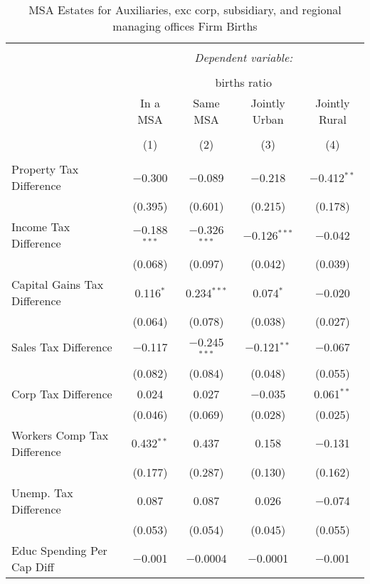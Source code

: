 
\begin{table}[!htbp] \centering 
  \caption{MSA Estates for  Auxiliaries, exc corp, subsidiary, and regional managing offices Firm Births} 
  \label{95metro} 
\begin{tabular}{@{\extracolsep{5pt}}lcccc} 
\\[-1.8ex]\hline 
\hline \\[-1.8ex] 
 & \multicolumn{4}{c}{\textit{Dependent variable:}} \\ 
\cline{2-5} 
\\[-1.8ex] & \multicolumn{4}{c}{births ratio} \\ 
 & In a MSA & Same MSA & Jointly Urban & Jointly Rural \\ 
\\[-1.8ex] & (1) & (2) & (3) & (4)\\ 
\hline \\[-1.8ex] 
 Property Tax Difference & $-$0.300 & $-$0.089 & $-$0.218 & $-$0.412$^{**}$ \\ 
  & (0.395) & (0.601) & (0.215) & (0.178) \\ 
  Income Tax Difference & $-$0.188$^{***}$ & $-$0.326$^{***}$ & $-$0.126$^{***}$ & $-$0.042 \\ 
  & (0.068) & (0.097) & (0.042) & (0.039) \\ 
  Capital Gains Tax Difference & 0.116$^{*}$ & 0.234$^{***}$ & 0.074$^{*}$ & $-$0.020 \\ 
  & (0.064) & (0.078) & (0.038) & (0.027) \\ 
  Sales Tax Difference & $-$0.117 & $-$0.245$^{***}$ & $-$0.121$^{**}$ & $-$0.067 \\ 
  & (0.082) & (0.084) & (0.048) & (0.055) \\ 
  Corp Tax Difference & 0.024 & 0.027 & $-$0.035 & 0.061$^{**}$ \\ 
  & (0.046) & (0.069) & (0.028) & (0.025) \\ 
  Workers Comp Tax Difference & 0.432$^{**}$ & 0.437 & 0.158 & $-$0.131 \\ 
  & (0.177) & (0.287) & (0.130) & (0.162) \\ 
  Unemp. Tax Difference & 0.087 & 0.087 & 0.026 & $-$0.074 \\ 
  & (0.053) & (0.054) & (0.045) & (0.055) \\ 
  Educ Spending Per Cap Diff & $-$0.001 & $-$0.0004 & $-$0.0001 & $-$0.001 \\ 

\end{tabular}
\end{table}
